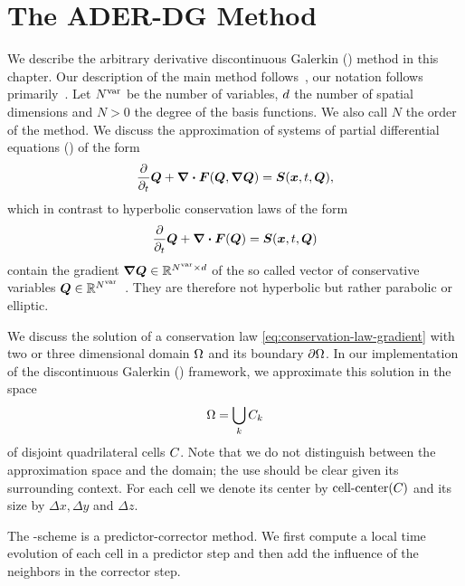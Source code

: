 \section{The ADER-DG Method}\label{sec:ader-dg}
We describe the arbitrary derivative discontinuous Galerkin (\aderdg) method in this chapter.
Our description of the main method follows~\cite{dumbser2008unified,dumbser2010arbitrary,dumbser2018efficient}, our notation follows primarily~\cite{dumbser2018efficient}.
Let $N^{\text{var}}$ be the number of variables, $d$ the number of spatial dimensions and $N > 0$ the degree of the basis functions.
We also call $N$ the order of the method.
We discuss the approximation of systems of partial differential equations (\pde) of the form
\begin{equation}
  \label{eq:conservation-law-gradient}
 \frac{\partial}{\partial_t}  \Q + \div \flux(\Q, \gradQ) = \source(\bm{x}, t, \Q),
\end{equation}
which in contrast to hyperbolic conservation laws of the form
\begin{equation}
  \label{eq:conservation-law}
 \frac{\partial}{\partial_t}  \Q + \div \flux(\Q) = \source(\bm{x}, t, \Q)
\end{equation}
contain the gradient $\gradQ \in \mathbb{R}^{\NVar \times \dimensions}$ of the so called vector of conservative variables $\bm{Q} \in \mathbb{R}^{N^{\text{var}}}$~\cite{dumbser2010arbitrary}.
They are therefore not hyperbolic but rather parabolic or elliptic.

We discuss the solution of a conservation law \cref{eq:conservation-law-gradient} with two or three dimensional domain $\Omega$ and its boundary $\partial \Omega$.
In our implementation of the discontinuous Galerkin (\dg) framework, we approximate this solution in the space
\begin{equation}
  \label{eq:dg-space}
  \broken = \bigcup_k \cell[k]
\end{equation}
of disjoint quadrilateral cells $C_{}$.
Note that we do not distinguish between the approximation space and the domain; the use should be clear given its surrounding context.
For each cell we denote its center by $\operatorname{cell-center} (C_{})$ and its size by $\Delta x, \Delta y$ and $\Delta z$.

The \aderdg{}-scheme is a predictor-corrector method.
We first compute a local time evolution of each cell in a predictor step and then add the influence of the neighbors in the corrector step.

